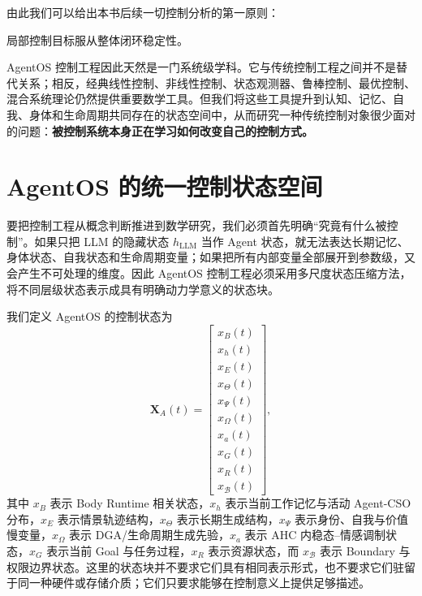 由此我们可以给出本书后续一切控制分析的第一原则：
\begin{proposition*}
局部控制目标服从整体闭环稳定性。
\end{proposition*}
AgentOS 控制工程因此天然是一门系统级学科。它与传统控制工程之间并不是替代关系；相反，经典线性控制、非线性控制、状态观测器、鲁棒控制、最优控制、混合系统理论仍然提供重要数学工具。但我们将这些工具提升到认知、记忆、自我、身体和生命周期共同存在的状态空间中，从而研究一种传统控制对象很少面对的问题：\textbf{被控制系统本身正在学习如何改变自己的控制方式。}

\section{AgentOS 的统一控制状态空间}

要把控制工程从概念判断推进到数学研究，我们必须首先明确“究竟有什么被控制”。如果只把 LLM 的隐藏状态 $h_{\mathrm{LLM}}$ 当作 Agent 状态，就无法表达长期记忆、身体状态、自我状态和生命周期变量；如果把所有内部变量全部展开到参数级，又会产生不可处理的维度。因此 AgentOS 控制工程必须采用多尺度状态压缩方法，将不同层级状态表示成具有明确动力学意义的状态块。

我们定义 AgentOS 的控制状态为
\[
\mathbf X_A(t)
=
\begin{bmatrix}
x_B(t)\\
x_h(t)\\
x_E(t)\\
x_\Theta(t)\\
x_\Psi(t)\\
x_\Omega(t)\\
x_a(t)\\
x_G(t)\\
x_R(t)\\
x_{\mathcal B}(t)
\end{bmatrix},
\]
其中 $x_B$ 表示 Body Runtime 相关状态，$x_h$ 表示当前工作记忆与活动 Agent-CSO 分布，$x_E$ 表示情景轨迹结构，$x_\Theta$ 表示长期生成结构，$x_\Psi$ 表示身份、自我与价值慢变量，$x_\Omega$ 表示 DGA/生命周期生成先验，$x_a$ 表示 AHC 内稳态--情感调制状态，$x_G$ 表示当前 Goal 与任务过程，$x_R$ 表示资源状态，而 $x_{\mathcal B}$ 表示 Boundary 与权限边界状态。这里的状态块并不要求它们具有相同表示形式，也不要求它们驻留于同一种硬件或存储介质；它们只要求能够在控制意义上提供足够描述。

